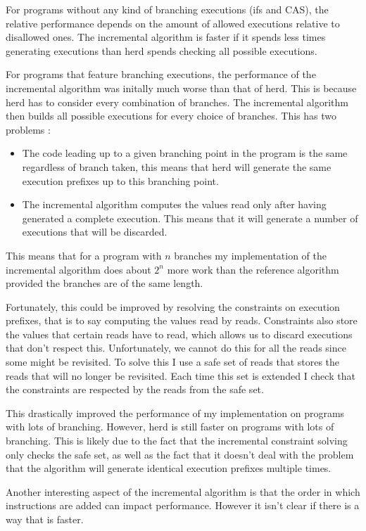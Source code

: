 \documentclass[a4,11pt,dvipsnames]{article}
\begin{document}
For programs without any kind of branching executions (ifs and CAS), the relative performance depends on the amount of allowed executions relative to disallowed ones. The incremental algorithm is faster if it spends less times generating executions than herd spends checking all possible executions.

For programs that feature branching executions, the performance of the incremental algorithm was initally much worse than that of herd. This is because herd has to consider every combination of branches. The incremental algorithm then builds all possible executions for every choice of branches. This has two problems :
\begin{itemize}
\item The code leading up to a given branching point in the program is the same regardless of branch taken, this means that herd will generate the same execution prefixes up to this branching point.
\item The incremental algorithm computes the values read only after having generated a complete execution. This means that it will generate a number of executions that will be discarded.
\end{itemize}
This means that for a program with $n$ branches my implementation of the incremental algorithm does about $2^{n}$ more work than the reference algorithm provided the branches are of the same length.

Fortunately, this could be improved by resolving the constraints on execution prefixes, that is to say computing the values read by reads. Constraints also store the values that certain reads have to read, which allows us to discard executions that don't respect this. Unfortunately, we cannot do this for all the reads since some might be revisited. To solve this I use a safe set of reads that stores the reads that will no longer be revisited. Each time this set is extended I check that the constraints are respected by the reads from the safe set.

This drastically improved the performance of my implementation on programs with lots of branching. However, herd is still faster on programs with lots of branching. This is likely due to the fact that the incremental constraint solving only checks the safe set, as well as the fact that it doesn't deal with the problem that the algorithm will generate identical execution prefixes multiple times.

Another interesting aspect of the incremental algorithm is that the order in which instructions are added can impact performance. However it isn't clear if there is a way that is faster.
\end{document}
